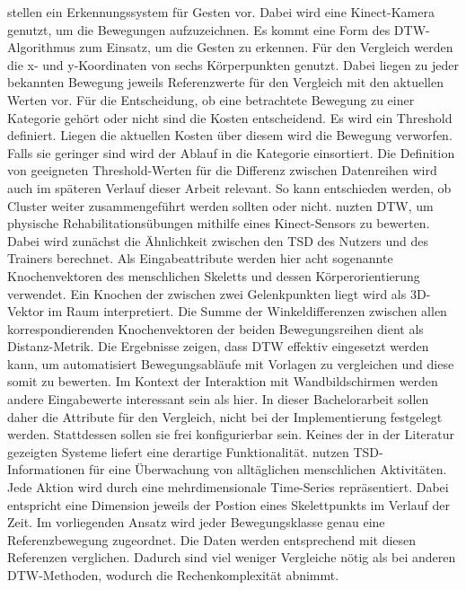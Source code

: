 \citet{wahyuni_motion_2021} stellen ein Erkennungssystem für Gesten vor.
Dabei wird eine Kinect-Kamera genutzt, um die Bewegungen aufzuzeichnen.
Es kommt eine Form des \ac{DTW}-Algorithmus zum Einsatz, um die Gesten zu erkennen.
Für den Vergleich werden die x- und y-Koordinaten von sechs Körperpunkten genutzt.
Dabei liegen zu jeder bekannten Bewegung jeweils Referenzwerte für den Vergleich mit den aktuellen Werten vor.
Für die Entscheidung, ob eine betrachtete Bewegung zu einer Kategorie gehört oder nicht sind die Kosten entscheidend.
Es wird ein Threshold definiert.
Liegen die aktuellen Kosten über diesem wird die Bewegung verworfen.
Falls sie geringer sind wird der Ablauf in die Kategorie einsortiert.
Die Definition von geeigneten Threshold-Werten für die Differenz zwischen Datenreihen
wird auch im späteren Verlauf dieser Arbeit relevant.
So kann entschieden werden, ob Cluster weiter zusammengeführt werden sollten oder nicht.
\citet{yu_dynamic_2019} nuzten \ac{DTW}, um physische Rehabilitationsübungen mithilfe eines Kinect-Sensors zu bewerten.
Dabei wird zunächst die Ähnlichkeit zwischen den \ac{TSD} des Nutzers und des Trainers berechnet.
Als Eingabeattribute werden hier acht sogenannte Knochenvektoren des menschlichen Skeletts und dessen Körperorientierung verwendet.
Ein Knochen der zwischen zwei Gelenkpunkten liegt wird als 3D-Vektor im Raum interpretiert.
Die Summe der Winkeldifferenzen zwischen allen korrespondierenden Knochenvektoren der beiden Bewegungsreihen dient
als Distanz-Metrik.
Die Ergebnisse zeigen, dass \ac{DTW} effektiv eingesetzt werden kann,
um automatisiert Bewegungsabläufe mit Vorlagen zu vergleichen und diese somit zu bewerten.
Im Kontext der Interaktion mit Wandbildschirmen werden andere Eingabewerte interessant sein als hier.
In dieser Bachelorarbeit sollen daher die Attribute für den Vergleich,
nicht bei der Implementierung festgelegt werden.
Stattdessen sollen sie frei konfigurierbar sein.
Keines der in der Literatur gezeigten Systeme liefert eine derartige Funktionalität.
\citet{mohammadzade_dynamic_2021} nutzen \ac{TSD}-Informationen für eine Überwachung von alltäglichen menschlichen Aktivitäten.
Jede Aktion wird durch eine mehrdimensionale Time-Series repräsentiert.
Dabei entspricht eine Dimension jeweils der Postion eines Skelettpunkts im Verlauf der Zeit.
Im vorliegenden Ansatz wird jeder Bewegungsklasse genau eine Referenzbewegung zugeordnet.
Die Daten werden entsprechend mit diesen Referenzen verglichen.
Dadurch sind viel weniger Vergleiche nötig als bei anderen \ac{DTW}-Methoden,
wodurch die Rechenkomplexität abnimmt.
